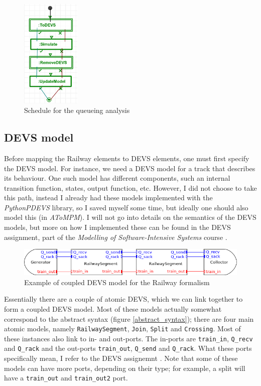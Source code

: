 \documentclass{article}
\begin{document}
\begin{figure}[H]
    \centering
    \includegraphics[width=0.25\textwidth]{images/queueing_analysis_schedule.png}
    \caption{Schedule for the queueing analysis}
    \label{schedule_queueing}
\end{figure}

\subsection{DEVS model}

Before mapping the Railway elements to DEVS elements, one must first specify the DEVS model. For instance, we need a DEVS model for a track that describes its behaviour. One such model has different components, such an internal transition function, states, output function, etc. However, I did not choose to take this path, instead I already had these models implemented with the \textit{PythonPDEVS} library, so I saved myself some time, but ideally one should also model this (in \textit{AToMPM}). I will not go into details on the semantics of the DEVS models, but more on how I implemented these can be found in the DEVS assignment, part of the \textit{Modelling of Software-Intensive Systems} course \cite{devs_assignment}.

\begin{figure}[H]
    \centering
    \includegraphics[width=\textwidth]{images/devs_overview.png}
    \caption{Example of coupled DEVS model for the Railway formalism \cite{devs_assignment}}
    \label{coupled_devs_example}
\end{figure}

Essentially there are a couple of atomic DEVS, which we can link together to form a coupled DEVS model. Most of these models actually somewhat correspond to the abstract syntax (figure \ref{abstract_syntax}); there are four main atomic models, namely \texttt{RailwaySegment}, \texttt{Join}, \texttt{Split} and \texttt{Crossing}. Most of these instances also link to in- and out-ports. The in-ports are \texttt{train\_in}, \texttt{Q\_recv} and \texttt{Q\_rack} and the out-ports \texttt{train\_out}, \texttt{Q\_send} and \texttt{Q\_rack}. What these ports specifically mean, I refer to the DEVS assignemnt \cite{devs_assignment}. Note that some of these models can have more ports, depending on their type; for example, a split will have a \texttt{train\_out} and \texttt{train\_out2} port.
\end{document}
